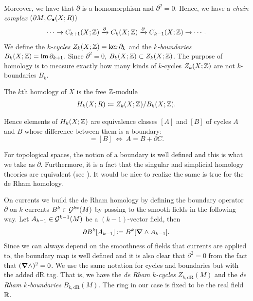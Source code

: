 \documentclass{article}
\begin{document}
Moreover, we have that $\partial$ is a homomorphism and $\partial^2=0$. Hence, we have a \emph{chain complex} $({\partial M}, C_\bullet(X;R))$
\begin{equation}
\cdots \to C_{k+1}(X;\mathbb{Z}) \xrightarrow{\partial} C_k(X;\mathbb{Z}) \xrightarrow{\partial} C_{k-1}(X;\mathbb{Z}) \to \cdots.
\end{equation}
We define the \emph{$k$-cycles} $Z_k(X;\mathbb{Z})=\ker \partial_k$ and the \emph{$k$-boundaries} $B_k(X;\mathbb{Z}) = \operatorname{im} \partial_{k+1}$. Since $\partial^2=0$, $B_k(X;\mathbb{Z})\subset Z_k(X;\mathbb{Z})$. The purpose of homology is to measure exactly how many kinds of $k$-cycles $Z_k(X;\mathbb{Z})$ are not $k$-boundaries $B_k$. 
\begin{definition}
The $k$th homology of $X$ is the free $\mathbb{Z}$-module
\begin{equation}
    H_k(X;R) \coloneqq Z_k(X;\mathbb{Z})/B_k(X;\mathbb{Z}).
\end{equation}
\end{definition}
Hence elements of $H_k(X;\mathbb{Z})$ are equivalence classes $[A]$ and $[B]$ of cycles $A$ and $B$ whose difference between them is a boundary: 
\begin{equation}
[A]=[B] ~ \iff ~ A=B+\partial C.
\end{equation}

For topological spaces, the notion of a boundary is well defined and this is what we take as $\partial$. Furthermore, it is a fact that the singular and simplicial homology theories are equivalent (see \cite{hatcher_algebraic_2002}). It would be nice to realize the same is true for the de Rham homology.

On currents we build the de Rham homology \cite{iversen_cauchy_1989,lekhyananda_homology_nodate, giaquinta_cartesian_1998} by defining the boundary operator $\partial$ on $k$-currents $B^k \in \mathcal{G}^{k*}(M)$ by passing to the smooth fields in the following way. Let $A_{k-1}\in \mathcal{G}^{k-1}(M)$ be a $(k-1)$-vector field, then
\begin{equation}
\partial B^{k}[A_{k-1}] \coloneqq B^{k}[\boldsymbol{\nabla} \wedge A_{k-1}].
\end{equation}
Since we can always depend on the smoothness of fields that currents are applied to, the boundary map is well defined and it is also clear that $\partial^2 = 0$ from the fact that $(\boldsymbol{\nabla} \wedge)^2=0$. We use the same notation for cycles and boundaries but with the added dR tag. That is, we have the \emph{de Rham $k$-cycles} $Z_{k,\mathrm{dR}}(M)$ and the \emph{de Rham $k$-boundaries} $B_{k, \mathrm{dR}}(M)$. The ring in our case is fixed to be the real field $\mathbb{R}$. 
\end{document}
